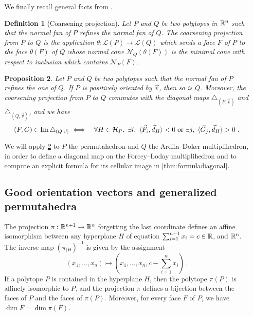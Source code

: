 \documentclass[twoside, 11pt]{amsart}
\newtheorem{definition}{Definition}[section]
\newtheorem{proposition}[definition]{Proposition}
\theoremstyle{remark}
\begin{document}
We finally recall general facts from \cite[Section 1.6]{LA21}. 

\begin{definition}[Coarsening projection] 
  \label{def:coarseningprojection} 
  Let $P$ and $Q$ be two polytopes in $\mathbb{R}^n$ such that the normal fan of $P$ refines the normal fan of $Q$. 
  The \emph{coarsening projection} from $P$ to $Q$ is the application $\theta : \mathcal{L}(P)\to\mathcal{L}(Q)$ which sends a face $F$ of $P$ to the face $\theta(F)$ of $Q$ whose normal cone $\mathcal{N}_Q(\theta(F))$ is the minimal cone with respect to inclusion which contains $\mathcal{N}_P(F)$.
\end{definition}

\begin{proposition} 
\label{prop:refinementofnormalfans}
Let $P$ and $Q$ be two polytopes such that the normal fan of $P$ refines the one of $Q$. 
If $P$ is positively oriented by $\vec v$, then so is $Q$. 
Moreover, the coarsening projection from $P$ to $Q$ commutes with the diagonal maps $\triangle_{(P,\vec v)}$ and $\triangle_{(Q,\vec v)}$, and we have 
\begin{eqnarray*}
  (F,G) \in \operatorname{Im} \triangle_{(Q,\vec v)} 
  &\iff& \forall H \in \mathcal{H}_P , \ \exists i , \ \langle \vec F_i, \vec d_H \rangle < 0  \text{ or } \exists j , \ \langle \vec G_j, \vec d_H \rangle > 0 \ .
\end{eqnarray*} 
\end{proposition}

We will apply \cref{prop:refinementofnormalfans} to $P$ the permutahedron and $Q$ the Ardila--Doker multiplihedron, in order to define a diagonal map on the Forcey--Loday multiplihedron and to compute an explicit formula for its cellular image in \cref{thm:formuladiagonal}.


\subsection{Good orientation vectors and generalized permutahedra}

The projection $\pi : \mathbb{R}^{n+1} \to \mathbb{R}^n$ forgetting the last coordinate defines an affine isomorphism between any hyperplane $H$ of equation $\sum_{i=1}^{n+1} x_i = c \in \mathbb{R}$, and $\mathbb{R}^n$. 
The inverse map $(\pi_{| H})^{-1}$ is given by the assignment \[ (x_1, \ldots, x_n) \mapsto \left(x_1, \ldots, x_n, c- \sum_{i=1}^{n}x_i\right) \ . \]
If a polytope $P$ is contained in the hyperplane $H$, then the polytope $\pi(P)$ is affinely isomorphic to $P$, and the projection $\pi$ defines a bijection between the faces of $P$ and the faces of $\pi(P)$. Moreover, for every face $F$ of $P$, we have $\dim F = \dim \pi(F)$.
\end{document}
